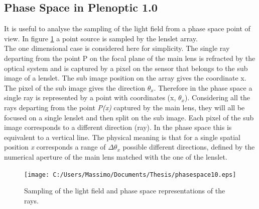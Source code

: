 \subsection{Phase Space in Plenoptic 1.0}
\label{sec:phase_space}
It is useful to analyse the sampling of the light field from a phase space point of view. In figure \ref{fig:plenoptic6} a point source is sampled by the lenslet array.\\
 The one dimensional case is considered here for simplicity. The single ray departing from the point P on the focal plane of the main lens is refracted by the optical system and is captured by a pixel on the sensor that belongs to the sub image of a lenslet. The sub image position on the array gives the coordinate x. The pixel of the sub image gives the direction $\theta_x$. Therefore in the phase space a single ray is represented by a point with coordinates (x, $\theta_x$).
Considering all the rays departing from the point \textit{P(x)} captured by the main lens, they will all be focused on a single lenslet and then split on the sub image. Each pixel of the sub image corresponds to a different direction (ray). In the phase space this is equivalent to a vertical line. The physical meaning is that for a single spatial position \textit{x} corresponds a range of $\Delta \theta_x$ possible different directions, defined by the numerical aperture of the main lens matched with the one of the lenslet.\\
\newpage
\begin{figure}[H]
	\centering
	\texttt{[image: C:/Users/Massimo/Documents/Thesis/phasespace10.eps]}
	\caption{\label{fig:plenoptic6}Sampling of the light field and phase space representations of the rays.  }
\end{figure}
\newpage
